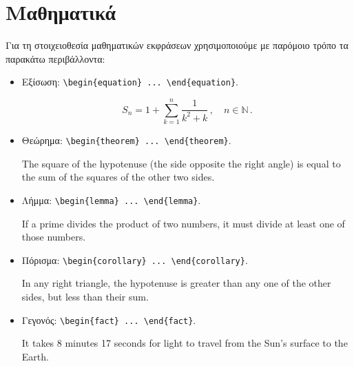 \section{Μαθηματικά}
\label{sec:Mathematics}
Για τη στοιχειοθεσία μαθηματικών εκφράσεων χρησιμοποιούμε με παρόμοιο τρόπο τα παρακάτω περιβάλλοντα:
\begin{itemize}
	\item Εξίσωση: \verb|\begin{equation} ... \end{equation}|.

	\begin{equation}
		S_{n} = 1 + \sum_{k=1}^{n}\frac{1}{k^{2} + k}\,,\quad n \in \mathbb{N}\,.
		\label{eq:Example}
	\end{equation}

	\item Θεώρημα: \verb|\begin{theorem} ... \end{theorem}|.

	\begin{theorem}
		Τhe square of the hypotenuse (the side opposite the right angle) is equal to the sum of the squares of the other two sides.
	\end{theorem}

	\item Λήμμα: \verb|\begin{lemma} ... \end{lemma}|.

	\begin{lemma}
		If a prime divides the product of two numbers, it must divide at least one of those numbers.
	\end{lemma}

	\item Πόρισμα: \verb|\begin{corollary} ... \end{corollary}|.

	\begin{corollary}
		In any right triangle, the hypotenuse is greater than any one of the other sides, but less than their sum.
	\end{corollary}

	\item Γεγονός: \verb|\begin{fact} ... \end{fact}|.

	\begin{fact}
		It takes 8 minutes 17 seconds for light to travel from the Sun’s surface to the Earth.
	\end{fact}


\end{itemize}
